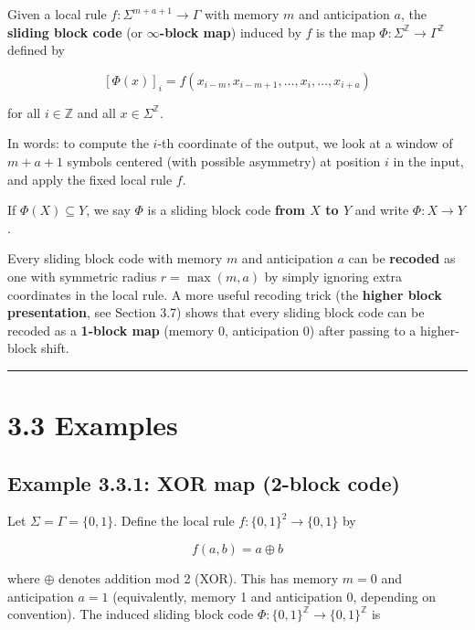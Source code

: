 \begin{definition}
Given a local rule $f: \Sigma^{m+a+1} \to \Gamma$ with memory $m$ and anticipation $a$, the \textbf{sliding block code} (or \textbf{$\infty$-block map}) induced by $f$ is the map $\Phi: \Sigma^\mathbb{Z} \to \Gamma^\mathbb{Z}$ defined by

\[
[\Phi(x)]_i = f(x_{i-m}, x_{i-m+1}, \ldots, x_i, \ldots, x_{i+a})
\]

for all $i \in \mathbb{Z}$ and all $x \in \Sigma^\mathbb{Z}$.

In words: to compute the $i$-th coordinate of the output, we look at a window of $m + a + 1$ symbols centered (with possible asymmetry) at position $i$ in the input, and apply the fixed local rule $f$.

If $\Phi(X) \subseteq Y$, we say $\Phi$ is a sliding block code \textbf{from $X$ to $Y$} and write $\Phi: X \to Y$.
\end{definition}

\begin{remark}
Every sliding block code with memory $m$ and anticipation $a$ can be \textbf{recoded} as one with symmetric radius $r = \max(m, a)$ by simply ignoring extra coordinates in the local rule. A more useful recoding trick (the \textbf{higher block presentation}, see Section 3.7) shows that every sliding block code can be recoded as a \textbf{1-block map} (memory 0, anticipation 0) after passing to a higher-block shift.

\bigskip\hrule\bigskip
\end{remark}

\section{3.3 Examples}

\subsection{Example 3.3.1: XOR map (2-block code)}

Let $\Sigma = \Gamma = \{ 0, 1\} $. Define the local rule $f: \{ 0,1\} ^2 \to \{ 0,1\} $ by

\[
f(a, b) = a \oplus b
\]

where $\oplus$ denotes addition mod 2 (XOR). This has memory $m = 0$ and anticipation $a = 1$ (equivalently, memory 1 and anticipation 0, depending on convention). The induced sliding block code $\Phi: \{ 0,1\} ^\mathbb{Z} \to \{ 0,1\} ^\mathbb{Z}$ is

